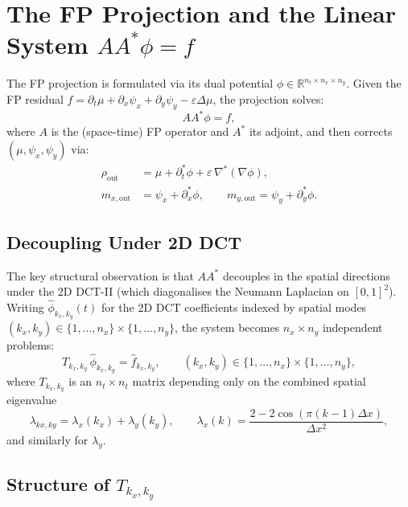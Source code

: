\documentclass[11pt]{article}
\newcommand{\eps}{\varepsilon}
\newcommand{\dx}{\Delta x}
\newcommand{\RR}{\mathbb{R}}
\newcommand{\lxy}{\lambda_{kx,ky}}
\begin{document}
\section{The FP Projection and the Linear System $AA^* \phi = f$}
\label{sec:structure}

The FP projection is formulated via its dual potential $\phi \in \RR^{n_t \times n_x \times n_y}$.
Given the FP residual $f = \partial_t \mu + \partial_x \psi_x + \partial_y \psi_y - \eps \Delta \mu$,
the projection solves:
\begin{equation}
  A A^* \phi = f,
\end{equation}
where $A$ is the (space-time) FP operator and $A^*$ its adjoint, and then corrects
$(\mu, \psi_x, \psi_y)$ via:
\begin{align}
  \rho_{\mathrm{out}} &= \mu + \partial_t^* \phi + \eps \, \nabla^* (\nabla \phi), \\
  m_{x,\mathrm{out}} &= \psi_x + \partial_x^* \phi, \qquad
  m_{y,\mathrm{out}} = \psi_y + \partial_y^* \phi.
\end{align}

\subsection{Decoupling Under 2D DCT}

The key structural observation is that $AA^*$ decouples in the spatial directions under
the 2D DCT-II (which diagonalises the Neumann Laplacian on $[0,1]^2$).
Writing $\hat{\phi}_{k_x, k_y}(t)$ for the 2D DCT coefficients indexed by spatial modes
$(k_x, k_y) \in \{1,\ldots,n_x\} \times \{1,\ldots,n_y\}$, the system becomes
$n_x \times n_y$ independent problems:
\begin{equation}
  T_{k_x, k_y} \, \hat{\phi}_{k_x,k_y} = \hat{f}_{k_x, k_y},
  \qquad (k_x, k_y) \in \{1,\ldots,n_x\} \times \{1,\ldots,n_y\},
\end{equation}
where $T_{k_x,k_y}$ is an $n_t \times n_t$ matrix depending only on the combined
spatial eigenvalue
\begin{equation}
  \lxy = \lambda_x(k_x) + \lambda_y(k_y),
  \qquad \lambda_x(k) = \frac{2 - 2\cos(\pi (k-1) \dx)}{\dx^2},
\end{equation}
and similarly for $\lambda_y$.

\subsection{Structure of $T_{k_x,k_y}$}
\end{document}
